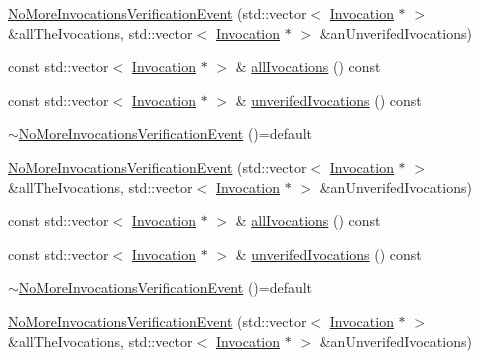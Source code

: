 \begin{DoxyCompactItemize}
\mbox{\hyperlink{structfakeit_1_1NoMoreInvocationsVerificationEvent_a4c590fe7b3fb11f7121af65f4a0d3ed5}{No\+More\+Invocations\+Verification\+Event}} (std\+::vector$<$ \mbox{\hyperlink{structfakeit_1_1Invocation}{Invocation}} $\ast$ $>$ \&all\+The\+Ivocations, std\+::vector$<$ \mbox{\hyperlink{structfakeit_1_1Invocation}{Invocation}} $\ast$ $>$ \&an\+Unverifed\+Ivocations)
\item 
const std\+::vector$<$ \mbox{\hyperlink{structfakeit_1_1Invocation}{Invocation}} $\ast$ $>$ \& \mbox{\hyperlink{structfakeit_1_1NoMoreInvocationsVerificationEvent_aa69cf6dc4a816429653a5885f38d07b5}{all\+Ivocations}} () const
\item 
const std\+::vector$<$ \mbox{\hyperlink{structfakeit_1_1Invocation}{Invocation}} $\ast$ $>$ \& \mbox{\hyperlink{structfakeit_1_1NoMoreInvocationsVerificationEvent_aaff3cb0916a4fe853f6f4e5fcc7f2632}{unverifed\+Ivocations}} () const
\item 
\mbox{\hyperlink{structfakeit_1_1NoMoreInvocationsVerificationEvent_a1db7bd8cb45dc62b87c744e628b93d4d}{$\sim$\+No\+More\+Invocations\+Verification\+Event}} ()=default
\item 
\mbox{\hyperlink{structfakeit_1_1NoMoreInvocationsVerificationEvent_a4c590fe7b3fb11f7121af65f4a0d3ed5}{No\+More\+Invocations\+Verification\+Event}} (std\+::vector$<$ \mbox{\hyperlink{structfakeit_1_1Invocation}{Invocation}} $\ast$ $>$ \&all\+The\+Ivocations, std\+::vector$<$ \mbox{\hyperlink{structfakeit_1_1Invocation}{Invocation}} $\ast$ $>$ \&an\+Unverifed\+Ivocations)
\item 
const std\+::vector$<$ \mbox{\hyperlink{structfakeit_1_1Invocation}{Invocation}} $\ast$ $>$ \& \mbox{\hyperlink{structfakeit_1_1NoMoreInvocationsVerificationEvent_aa69cf6dc4a816429653a5885f38d07b5}{all\+Ivocations}} () const
\item 
const std\+::vector$<$ \mbox{\hyperlink{structfakeit_1_1Invocation}{Invocation}} $\ast$ $>$ \& \mbox{\hyperlink{structfakeit_1_1NoMoreInvocationsVerificationEvent_aaff3cb0916a4fe853f6f4e5fcc7f2632}{unverifed\+Ivocations}} () const
\item 
\mbox{\hyperlink{structfakeit_1_1NoMoreInvocationsVerificationEvent_a1db7bd8cb45dc62b87c744e628b93d4d}{$\sim$\+No\+More\+Invocations\+Verification\+Event}} ()=default
\item 
\mbox{\hyperlink{structfakeit_1_1NoMoreInvocationsVerificationEvent_a4c590fe7b3fb11f7121af65f4a0d3ed5}{No\+More\+Invocations\+Verification\+Event}} (std\+::vector$<$ \mbox{\hyperlink{structfakeit_1_1Invocation}{Invocation}} $\ast$ $>$ \&all\+The\+Ivocations, std\+::vector$<$ \mbox{\hyperlink{structfakeit_1_1Invocation}{Invocation}} $\ast$ $>$ \&an\+Unverifed\+Ivocations)

\end{DoxyCompactItemize}
